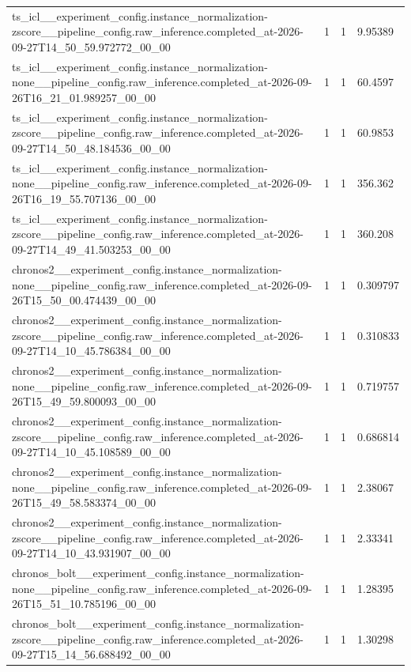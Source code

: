 \begin{tabular}{llll}
ts\_icl\_\_experiment\_config.instance\_normalization-zscore\_\_pipeline\_config.raw\_inference.completed\_at-2026-09-27T14\_50\_59.972772\_00\_00 & 1 & 1 & 9.95389 \\
ts\_icl\_\_experiment\_config.instance\_normalization-none\_\_pipeline\_config.raw\_inference.completed\_at-2026-09-26T16\_21\_01.989257\_00\_00 & 1 & 1 & 60.4597 \\
ts\_icl\_\_experiment\_config.instance\_normalization-zscore\_\_pipeline\_config.raw\_inference.completed\_at-2026-09-27T14\_50\_48.184536\_00\_00 & 1 & 1 & 60.9853 \\
ts\_icl\_\_experiment\_config.instance\_normalization-none\_\_pipeline\_config.raw\_inference.completed\_at-2026-09-26T16\_19\_55.707136\_00\_00 & 1 & 1 & 356.362 \\
ts\_icl\_\_experiment\_config.instance\_normalization-zscore\_\_pipeline\_config.raw\_inference.completed\_at-2026-09-27T14\_49\_41.503253\_00\_00 & 1 & 1 & 360.208 \\
chronos2\_\_experiment\_config.instance\_normalization-none\_\_pipeline\_config.raw\_inference.completed\_at-2026-09-26T15\_50\_00.474439\_00\_00 & 1 & 1 & 0.309797 \\
chronos2\_\_experiment\_config.instance\_normalization-zscore\_\_pipeline\_config.raw\_inference.completed\_at-2026-09-27T14\_10\_45.786384\_00\_00 & 1 & 1 & 0.310833 \\
chronos2\_\_experiment\_config.instance\_normalization-none\_\_pipeline\_config.raw\_inference.completed\_at-2026-09-26T15\_49\_59.800093\_00\_00 & 1 & 1 & 0.719757 \\
chronos2\_\_experiment\_config.instance\_normalization-zscore\_\_pipeline\_config.raw\_inference.completed\_at-2026-09-27T14\_10\_45.108589\_00\_00 & 1 & 1 & 0.686814 \\
chronos2\_\_experiment\_config.instance\_normalization-none\_\_pipeline\_config.raw\_inference.completed\_at-2026-09-26T15\_49\_58.583374\_00\_00 & 1 & 1 & 2.38067 \\
chronos2\_\_experiment\_config.instance\_normalization-zscore\_\_pipeline\_config.raw\_inference.completed\_at-2026-09-27T14\_10\_43.931907\_00\_00 & 1 & 1 & 2.33341 \\
chronos\_bolt\_\_experiment\_config.instance\_normalization-none\_\_pipeline\_config.raw\_inference.completed\_at-2026-09-26T15\_51\_10.785196\_00\_00 & 1 & 1 & 1.28395 \\
chronos\_bolt\_\_experiment\_config.instance\_normalization-zscore\_\_pipeline\_config.raw\_inference.completed\_at-2026-09-27T15\_14\_56.688492\_00\_00 & 1 & 1 & 1.30298 \\

\end{tabular}
